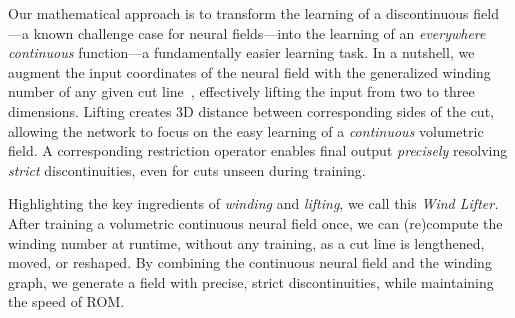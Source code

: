Our mathematical approach is to transform the learning of a discontinuous field---a known challenge case for neural fields---into the learning of an \emph{everywhere continuous} function---a fundamentally easier learning task. In a nutshell, we augment the input coordinates of the neural field with the generalized winding number of any given cut line~\cite{Jacobson:2018:GWN}, effectively lifting the input from two to three dimensions. Lifting creates 3D distance between corresponding sides of the cut, allowing the network to focus on the easy learning of a \emph{continuous} volumetric field. A corresponding restriction operator enables final output \emph{precisely} resolving \emph{strict} discontinuities, even for cuts unseen during training.

Highlighting the key ingredients of \emph{winding} and \emph{lifting}, we call this \emph{Wind Lifter.} After training a volumetric continuous neural field once, we can (re)compute the winding number at runtime, without any training, as a cut line is lengthened, moved, or reshaped. By combining the continuous neural field and the winding graph, we generate a field with precise, strict discontinuities, while maintaining the speed of ROM. 






